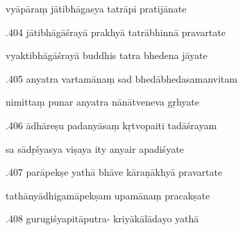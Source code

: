 \documentclass[article,12pt,a4paper]{memoir}%
\newcounter{parCount}
\begin{document}
	  
	  \pstart \leavevmode%
	vyāpāraṃ jātibhāgasya tatrāpi pratijānate 
	{}
	\pend%
      

	  
	  \pstart {}.404 jātibhāgāśrayā prakhyā tatrābhinnā pravartate 
	{}
	\pend%
      

	  
	  \pstart \leavevmode%
	vyaktibhāgāśrayā buddhis tatra bhedena jāyate 
	{}
	\pend%
      

	  
	  \pstart {}.405 anyatra vartamānaṃ sad   bhedābhedasamanvitam 
	{}
	\pend%
      

	  
	  \pstart \leavevmode%
	nimittaṃ punar anyatra nānātveneva gṛhyate 
	{}
	\pend%
      

	  
	  \pstart {}.406 ādhāreṣu padanyāsaṃ kṛtvopaiti tadāśrayam 
	{}
	\pend%
      

	  
	  \pstart \leavevmode%
	sa sādṛśyasya viṣaya ity anyair apadiśyate 
	{}
	\pend%
      

	  
	  \pstart {}.407 parāpekṣe yathā bhāve kāraṇākhyā pravartate 
	{}
	\pend%
      

	  
	  \pstart \leavevmode%
	tathānyādhigamāpekṣam upamānaṃ pracakṣate 
	{}
	\pend%
      

	  
	  \pstart {}.408 gurugiśyapitāputra- kriyākālādayo yathā 
	{}
	\pend%
      
\end{document}
